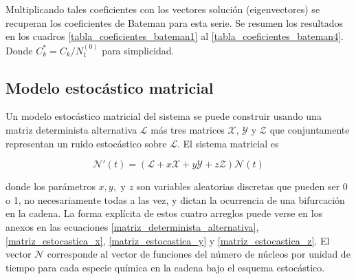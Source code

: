 Multiplicando tales coeficientes con  los vectores solución (eigenvectores) se recuperan los coeficientes de Bateman para esta serie. Se resumen los resultados en los cuadros \ref{tabla_coeficientes_bateman1} al \ref{tabla_coeficientes_bateman4}. Donde $C_k^*=C_k/N_1^{(0)}$ para simplicidad. 

\subsection{Modelo estocástico matricial}
Un modelo estocástico matricial del sistema se puede construir usando una matriz determinista alternativa $\mathcal{L}$ más tres matrices $\mathcal{X}$, $\mathcal{Y}$ y $\mathcal{Z}$ que conjuntamente representan un ruido estocástico sobre $\mathcal{L}$. El sistema matricial es

\begin{equation}
	\mathcal{N}'(t)=(\mathcal{L}+x\mathcal{X}+y\mathcal{Y}+z\mathcal{Z})\mathcal{N}(t)
\end{equation}

\noindent donde los parámetros $x, y,\textrm{ y }z$ son variables aleatorias discretas que pueden ser 0 o 1, no necesariamente todas a las vez, y dictan la ocurrencia de una bifurcación en la cadena. La forma explícita de estos cuatro arreglos puede verse en los anexos en las ecuaciones \ref{matriz_determinista_alternativa}, \ref{matriz_estocastica_x}, \ref{matriz_estocastica_y} y \ref{matriz_estocastica_z}. El vector $\mathcal{N}$ corresponde al vector de funciones del número de núcleos por unidad de tiempo para cada especie química en la cadena bajo el esquema estocástico. 